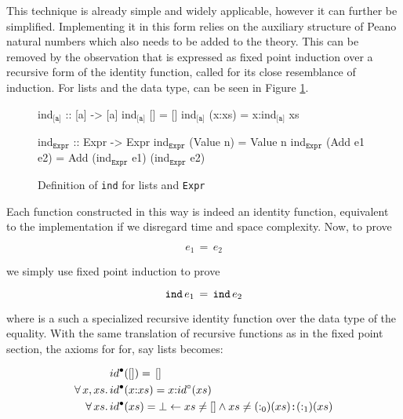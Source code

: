 This technique is already simple and widely applicable, however it can
further be simplified. Implementing it in this form relies on the
auxiliary structure of Peano natural numbers which also needs to be
added to the theory. This can be removed by the observation that is
expressed as fixed point induction over a recursive form of the
identity function, called  for its close resemblance of
induction. For lists and the  data type,  can be seen
in Figure \ref{code:ind}.

\begin{figure}[h!]
\centering
\begin{minipage}[b]{5cm}
\begin{code}[mathescape]
ind$_{\texttt{[a]}}$ :: [a] -> [a]
ind$_{\texttt{[a]}}$ [] = []
ind$_{\texttt{[a]}}$ (x:xs) = x:ind$_{\texttt{[a]}}$ xs
\end{code}
\end{minipage}
\hspace{10pt}
\begin{minipage}[b]{8.3cm}
\begin{code}[mathescape]
ind$_{\texttt{Expr}}$ :: Expr -> Expr
ind$_{\texttt{Expr}}$ (Value n) = Value n
ind$_{\texttt{Expr}}$ (Add e1 e2) = Add (ind$_{\texttt{Expr}}$ e1) (ind$_{\texttt{Expr}}$ e2)
\end{code}
\label{code:approx}
\end{minipage}
\caption{Definition of \texttt{ind} for lists and \texttt{Expr}
\label{code:ind}
}
\end{figure}

Each  function constructed in this way is indeed an identity
function, equivalent to the implementation  if we
disregard time and space complexity. Now, to prove

\begin{equation*}
e_1 \, = \, e_2
\end{equation*}

we simply use fixed point induction to prove

\begin{equation*}
\hs{ind} \, e_1 \, = \, \hs{ind} \, e_2
\end{equation*}

where  is a such a specialized recursive identity function over
the data type of the equality. With the same translation of recursive
functions as in the fixed point section, the axioms for  for, say
lists becomes:

\begin{align*}
            & \tofix{id}(\fn{[]})   \eq \, \fn{[]}                                                           \\
\faa{x}{xs} & \tofix{id}(x\fn{:}xs) \eq x\fn{:}\unfix{id}(xs)                                                \\
\fa{xs}     & \tofix{id}(xs)        \eq \bot \leftarrow xs \neq \fn{[]} \wedge xs \neq (\fn{:_0})(xs)\hs{:}(\fn{:_1})(xs) \\
\end{align*}

